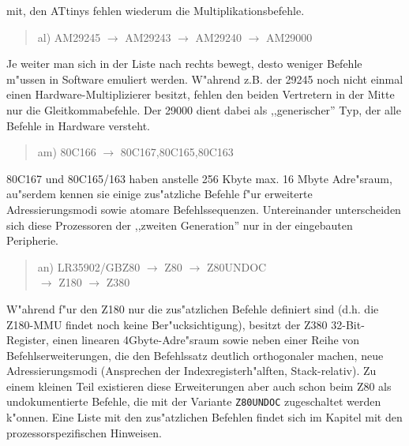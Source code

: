 \documentclass[12pt,a4paper,twoside]{report}
\newcommand{\tty}[1]{{\tt #1}}
\begin{document}
mit, den ATtinys fehlen wiederum die Multiplikationsbefehle.
\begin{quote}
al) AM29245 $\rightarrow$ AM29243 $\rightarrow$ AM29240 $\rightarrow$ AM29000
\end{quote}
Je weiter man sich in der Liste nach rechts bewegt, desto weniger
Befehle m"ussen in Software emuliert werden.  W"ahrend z.B. der 29245
noch nicht einmal einen Hardware-Multiplizierer besitzt, fehlen den
beiden Vertretern in der Mitte nur die Gleitkommabefehle.  Der 29000
dient dabei als ,,generischer'' Typ, der alle Befehle in Hardware versteht.
\begin{quote}
am) 80C166 $\longrightarrow$ 80C167,80C165,80C163
\end{quote}
80C167 und 80C165/163 haben anstelle 256 Kbyte max. 16 Mbyte Adre"sraum,
au"serdem kennen sie einige zus"atzliche Befehle f"ur erweiterte
Adressierungsmodi sowie atomare Befehlssequenzen.  Untereinander
unterscheiden sich diese Prozessoren der ,,zweiten Generation'' nur in der
eingebauten Peripherie.
\begin{quote}
an) LR35902/GBZ80 $\rightarrow$ Z80 $\rightarrow$ Z80UNDOC \\
    $\rightarrow$ Z180 $\rightarrow$ Z380
\end{quote}
W"ahrend f"ur den Z180 nur die zus"atzlichen Befehle definiert sind
(d.h. die Z180-MMU findet noch keine Ber"ucksichtigung), besitzt der
Z380 32-Bit-Register, einen linearen 4Gbyte-Adre"sraum sowie neben
einer Reihe von Befehlserweiterungen, die den Befehlssatz deutlich
orthogonaler machen, neue Adressierungsmodi (Ansprechen der
Indexregisterh"alften, Stack-relativ).  Zu einem kleinen Teil existieren
diese Erweiterungen aber auch schon beim Z80 als undokumentierte
Befehle, die mit der Variante \tty{Z80UNDOC} zugeschaltet werden
k"onnen.  Eine Liste mit den zus"atzlichen Befehlen findet sich im
Kapitel mit den prozessorspezifischen Hinweisen.
\end{document}
